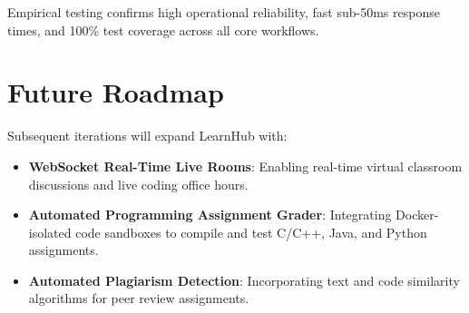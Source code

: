 \documentclass[12pt,a4paper]{report}
\begin{document}
Empirical testing confirms high operational reliability, fast sub-50ms response times, and 100\% test coverage across all core workflows.

\section{Future Roadmap}
Subsequent iterations will expand LearnHub with:
\begin{itemize}[itemsep=3pt]
    \item \textbf{WebSocket Real-Time Live Rooms}: Enabling real-time virtual classroom discussions and live coding office hours.
    \item \textbf{Automated Programming Assignment Grader}: Integrating Docker-isolated code sandboxes to compile and test C/C++, Java, and Python assignments.
    \item \textbf{Automated Plagiarism Detection}: Incorporating text and code similarity algorithms for peer review assignments.
\end{itemize}
\end{document}
